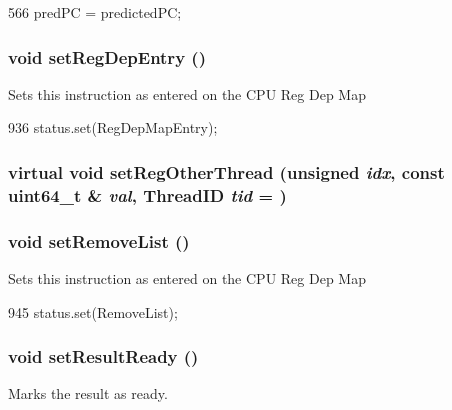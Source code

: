 \begin{DoxyCode}
566     { predPC = predictedPC; }
\end{DoxyCode}
\hypertarget{classInOrderDynInst_a662e013e969f1fc19006a1b479769c2c}{
\subsubsection[{setRegDepEntry}]{\setlength{\rightskip}{0pt plus 5cm}void setRegDepEntry ()}}
\label{classInOrderDynInst_a662e013e969f1fc19006a1b479769c2c}
Sets this instruction as entered on the CPU Reg Dep Map 


\begin{DoxyCode}
936 { status.set(RegDepMapEntry); }
\end{DoxyCode}
\hypertarget{classInOrderDynInst_a29b9290161684b20a1b45773925c8461}{
\subsubsection[{setRegOtherThread}]{\setlength{\rightskip}{0pt plus 5cm}virtual void setRegOtherThread (unsigned {\em idx}, \/  const uint64\_\-t \& {\em val}, \/  {\bf ThreadID} {\em tid} = {})}}
\label{classInOrderDynInst_a29b9290161684b20a1b45773925c8461}
\hypertarget{classInOrderDynInst_a6e2744311cfd76cdb12b88141528e668}{
\subsubsection[{setRemoveList}]{\setlength{\rightskip}{0pt plus 5cm}void setRemoveList ()}}
\label{classInOrderDynInst_a6e2744311cfd76cdb12b88141528e668}
Sets this instruction as entered on the CPU Reg Dep Map 


\begin{DoxyCode}
945 { status.set(RemoveList); }
\end{DoxyCode}
\hypertarget{classInOrderDynInst_a142437d4d0962c5b61960661f5141891}{
\subsubsection[{setResultReady}]{\setlength{\rightskip}{0pt plus 5cm}void setResultReady ()}}
\label{classInOrderDynInst_a142437d4d0962c5b61960661f5141891}
Marks the result as ready. 


